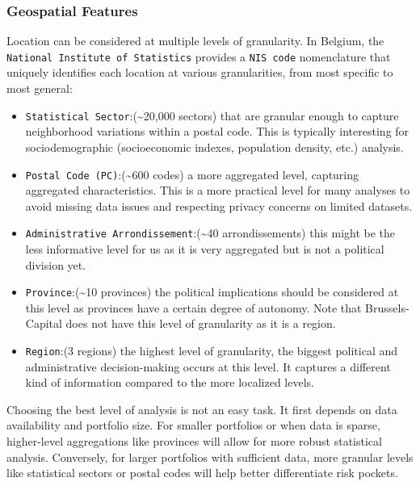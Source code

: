 \documentclass[
  english,
  11pt,
]{article}
\providecommand{\tightlist}{%
  \setlength{\itemsep}{0pt}\setlength{\parskip}{0pt}}
\begin{document}
\subsubsection{Geospatial Features}\label{geospatial-features}

Location can be considered at multiple levels of granularity. In
Belgium, the \texttt{National\ Institute\ of\ Statistics} provides a
\texttt{NIS\ code} nomenclature that uniquely identifies each location
at various granularities, from most specific to most general:

\begin{itemize}
\tightlist
\item
  \texttt{Statistical\ Sector}:(\textasciitilde20,000 sectors) that are
  granular enough to capture neighborhood variations within a postal
  code. This is typically interesting for sociodemographic
  (socioeconomic indexes, population density, etc.) analysis.
\item
  \texttt{Postal\ Code\ (PC)}:(\textasciitilde600 codes) a more
  aggregated level, capturing aggregated characteristics. This is a more
  practical level for many analyses to avoid missing data issues and
  respecting privacy concerns on limited datasets.
\item
  \texttt{Administrative\ Arrondissement}:(\textasciitilde40
  arrondissements) this might be the less informative level for us as it
  is very aggregated but is not a political division yet.
\item
  \texttt{Province}:(\textasciitilde10 provinces) the political
  implications should be considered at this level as provinces have a
  certain degree of autonomy. Note that Brussels-Capital does not have
  this level of granularity as it is a region.
\item
  \texttt{Region}:(3 regions) the highest level of granularity, the
  biggest political and administrative decision-making occurs at this
  level. It captures a different kind of information compared to the
  more localized levels.
\end{itemize}

Choosing the best level of analysis is not an easy task. It first
depends on data availability and portfolio size. For smaller portfolios
or when data is sparse, higher-level aggregations like provinces will
allow for more robust statistical analysis. Conversely, for larger
portfolios with sufficient data, more granular levels like statistical
sectors or postal codes will help better differentiate risk pockets.
\end{document}
